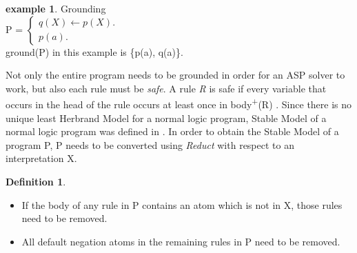 \documentclass[12pt,twoside]{report}
\theoremstyle{plain}
\theoremstyle{definition}
\newtheorem{defn}[thm]{Definition} %
\newtheorem{examp}{example}[section]
\begin{document}
\begin{examp} \normalfont Grounding \\

P = $\begin{cases}
	q(X)  \leftarrow p(X). \\
	p(a).
      \end{cases}$ \\

ground(P) in this example is \{p(a), q(a)\}.

\end{examp}
\label{grounding}

Not only the entire program needs to be grounded in order for an ASP solver to work, but also each rule must be \textit{safe}. A rule \textit{R} is safe if every variable that occurs in the head of the rule occurs at least once in body\textsuperscript{+}(R) .
Since there is no unique least Herbrand Model for a normal logic program, Stable Model of a normal logic program was defined in \cite{Gelfond1988}. In order to obtain the Stable Model of a program P, P needs to be converted using \textit{Reduct} with respect to an interpretation X. 
\begin{defn}
\begin{itemize}
The \textit{reduct} of P with respect to X can be constructed such that
\item If the body of any rule in P contains an atom which is not in X, those rules need to be removed. 
\item All default negation atoms in the remaining rules in P need to be removed.
\end{itemize}
\end{defn}
\end{document}
